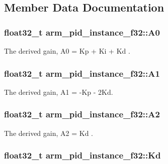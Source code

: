 \subsection{Member Data Documentation}
\hypertarget{structarm__pid__instance__f32_ad7b0bed64915d0a25a3409fa2dc45556}{
\subsubsection[{A0}]{\setlength{\rightskip}{0pt plus 5cm}float32\-\_\-t arm\-\_\-pid\-\_\-instance\-\_\-f32\-::\-A0}}\label{structarm__pid__instance__f32_ad7b0bed64915d0a25a3409fa2dc45556}
The derived gain, A0 = Kp + Ki + Kd . \hypertarget{structarm__pid__instance__f32_a7def89571c50f7137a213326a396e560}{
\subsubsection[{A1}]{\setlength{\rightskip}{0pt plus 5cm}float32\-\_\-t arm\-\_\-pid\-\_\-instance\-\_\-f32\-::\-A1}}\label{structarm__pid__instance__f32_a7def89571c50f7137a213326a396e560}
The derived gain, A1 = -\/\-Kp -\/ 2\-Kd. \hypertarget{structarm__pid__instance__f32_a155acf642ba2f521869f19d694cd7fa0}{
\subsubsection[{A2}]{\setlength{\rightskip}{0pt plus 5cm}float32\-\_\-t arm\-\_\-pid\-\_\-instance\-\_\-f32\-::\-A2}}\label{structarm__pid__instance__f32_a155acf642ba2f521869f19d694cd7fa0}
The derived gain, A2 = Kd . \hypertarget{structarm__pid__instance__f32_ad5b68fbf84d16188ae4747ff91f6f088}{
\subsubsection[{Kd}]{\setlength{\rightskip}{0pt plus 5cm}float32\-\_\-t arm\-\_\-pid\-\_\-instance\-\_\-f32\-::\-Kd}}\label{structarm__pid__instance__f32_ad5b68fbf84d16188ae4747ff91f6f088}

